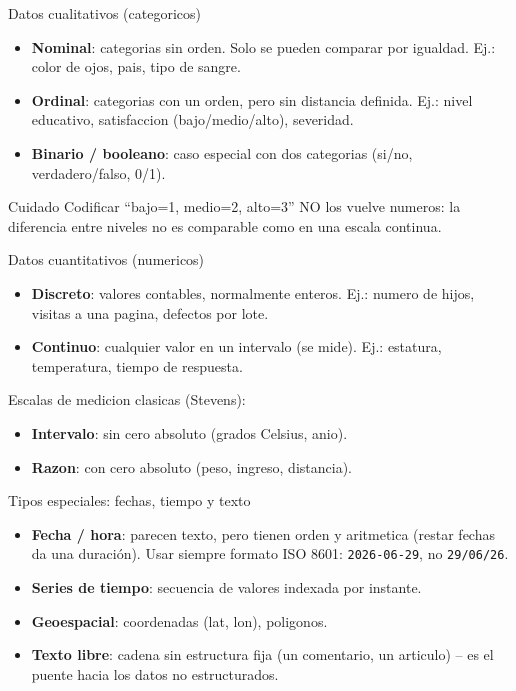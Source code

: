 \documentclass[aspectratio=169]{beamer}
\begin{document}
\begin{frame}{Datos cualitativos (categoricos)}
  \begin{itemize}
    \item \textbf{Nominal}: categorias sin orden. Solo se pueden comparar por
          igualdad. Ej.: color de ojos, pais, tipo de sangre.
    \item \textbf{Ordinal}: categorias con un orden, pero sin distancia definida.
          Ej.: nivel educativo, satisfaccion (bajo/medio/alto), severidad.
    \item \textbf{Binario / booleano}: caso especial con dos categorias
          (si/no, verdadero/falso, 0/1).
  \end{itemize}
  \begin{block}{Cuidado}
    Codificar ``bajo=1, medio=2, alto=3'' NO los vuelve numeros: la diferencia
    entre niveles no es comparable como en una escala continua.
  \end{block}
\end{frame}

\begin{frame}{Datos cuantitativos (numericos)}
  \begin{itemize}
    \item \textbf{Discreto}: valores contables, normalmente enteros.
          Ej.: numero de hijos, visitas a una pagina, defectos por lote.
    \item \textbf{Continuo}: cualquier valor en un intervalo (se mide).
          Ej.: estatura, temperatura, tiempo de respuesta.
  \end{itemize}
  \vspace{0.3em}
  Escalas de medicion clasicas (Stevens):
  \begin{itemize}
    \item \textbf{Intervalo}: sin cero absoluto (grados Celsius, anio).
    \item \textbf{Razon}: con cero absoluto (peso, ingreso, distancia).
  \end{itemize}
\end{frame}

\begin{frame}{Tipos especiales: fechas, tiempo y texto}
  \begin{itemize}
    \item \textbf{Fecha / hora}: parecen texto, pero tienen orden y aritmetica
          (restar fechas da una duraci\'on). Usar siempre formato ISO 8601:
          \texttt{2026-06-29}, no \texttt{29/06/26}.
    \item \textbf{Series de tiempo}: secuencia de valores indexada por instante.
    \item \textbf{Geoespacial}: coordenadas (lat, lon), poligonos.
    \item \textbf{Texto libre}: cadena sin estructura fija (un comentario, un
          articulo) -- es el puente hacia los datos no estructurados.
  \end{itemize}
\end{frame}
\end{document}
